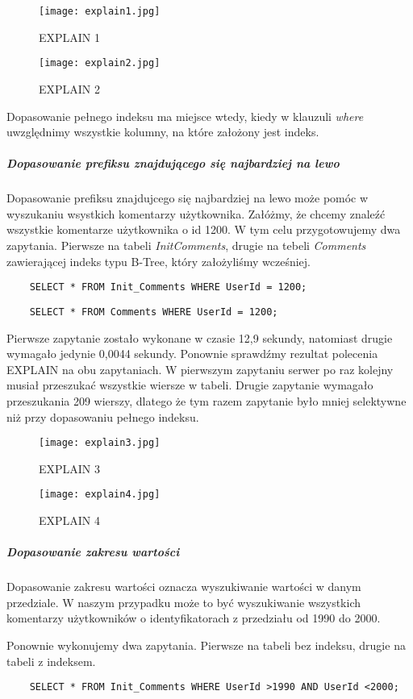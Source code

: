 \begin{figure}[h]
    \texttt{[image: explain1.jpg]} 
    \caption{EXPLAIN 1}
\end{figure}

\begin{figure}[h]
    \texttt{[image: explain2.jpg]} 
    \caption{EXPLAIN 2}
\end{figure}

Dopasowanie pełnego indeksu ma miejsce wtedy, kiedy w klauzuli \textit{where} uwzględnimy wszystkie kolumny, na które założony jest indeks. 
\subparagraph{Dopasowanie prefiksu znajdującego się najbardziej na lewo}\mbox{} 
Dopasowanie prefiksu znajdujcego się najbardziej na lewo może pomóc w wyszukaniu wsystkich komentarzy użytkownika. Załóżmy, że chcemy znaleźć wszystkie komentarze użytkownika o id 1200.
W tym celu przygotowujemy dwa zapytania. Pierwsze na tabeli \textit{Init\textunderscore Comments}, drugie na tebeli \textit{Comments} zawierającej indeks typu B-Tree, który założyliśmy wcześniej.
\begin{verbatim}
    SELECT * FROM Init_Comments WHERE UserId = 1200;
\end{verbatim}
\begin{verbatim}
    SELECT * FROM Comments WHERE UserId = 1200;
\end{verbatim}
Pierwsze zapytanie zostało wykonane w czasie 12,9 sekundy, natomiast drugie wymagało jedynie 0,0044 sekundy. Ponownie sprawdźmy rezultat polecenia EXPLAIN na obu zapytaniach. W pierwszym zapytaniu serwer po raz kolejny musiał przeszukać wszystkie wiersze w tabeli. Drugie zapytanie wymagało przeszukania 209 wierszy, dlatego że tym razem zapytanie było mniej selektywne niż przy dopasowaniu pełnego indeksu.
\begin{figure}[h]
    \texttt{[image: explain3.jpg]} 
    \caption{EXPLAIN 3}
\end{figure}

\begin{figure}[h]
    \texttt{[image: explain4.jpg]} 
    \caption{EXPLAIN 4}
\end{figure}

\subparagraph{Dopasowanie zakresu wartości}\mbox{}
Dopasowanie zakresu wartości oznacza wyszukiwanie wartości w danym przedziale. W naszym przypadku może to być wyszukiwanie wszystkich komentarzy użytkowników o identyfikatorach z przedziału od 1990 do 2000.

Ponownie wykonujemy dwa zapytania. Pierwsze na tabeli bez indeksu, drugie na tabeli z indeksem.
\begin{verbatim}
    SELECT * FROM Init_Comments WHERE UserId >1990 AND UserId <2000;
\end{verbatim}


